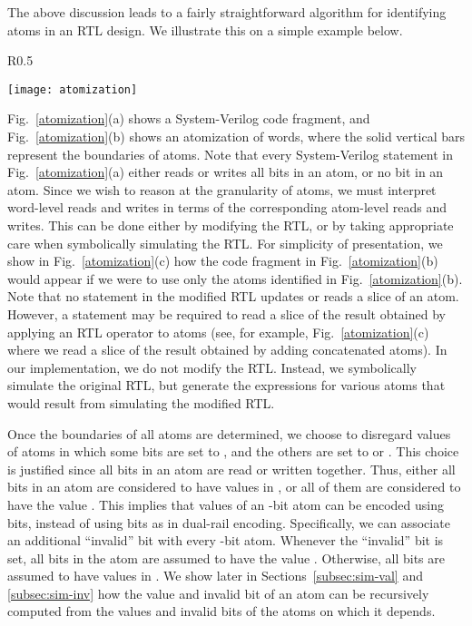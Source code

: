 \documentclass{llncs}
\begin{document}
The above discussion leads to a fairly straightforward algorithm for
identifying atoms in an RTL design.  We illustrate this on a simple example below.
\begin{wrapfigure}[16]{R}{0.5\textwidth}
\vspace*{-0.4in}
\begin{center}
\texttt{[image: atomization]}
\end{center}
\vspace*{-0.2in}
\caption{\label{atomization}Illustrating atomization}
\end{wrapfigure}
Fig.~\ref{atomization}(a) shows a System-Verilog code fragment, and
Fig.~\ref{atomization}(b) shows an atomization of words, where the
solid vertical bars represent the boundaries of atoms.  Note that
every System-Verilog statement in Fig.~\ref{atomization}(a) either
reads or writes all bits in an atom, or no bit in an atom.  Since we
wish to reason at the granularity of atoms, we must interpret
word-level reads and writes in terms of the corresponding atom-level
reads and writes.  This can be done either by modifying the RTL, or by
taking appropriate care when symbolically simulating the RTL.  For
simplicity of presentation, we show in Fig.~\ref{atomization}(c) how
the code fragment in Fig.~\ref{atomization}(b) would appear if we were
to use only the atoms identified in Fig.~\ref{atomization}(b).  Note
that no statement in the modified RTL updates or reads a slice of an
atom.  However, a statement may be required to read a slice of the
result obtained by applying an RTL operator to atoms (see, for example,
Fig.~\ref{atomization}(c) where we read a slice of the result obtained by
adding concatenated atoms). In our implementation, we do not modify the RTL.
Instead, we symbolically simulate the original RTL, but generate the
expressions for various atoms that would result from simulating the
modified RTL.

Once the boundaries of all atoms are determined, we choose to
disregard values of atoms in which some bits are set to , and the
others are set to  or .  This choice is justified since all bits
in an atom are  read or written together.  Thus, either all bits
in an atom are considered to have values in , or all of them
are considered to have the value .  This implies that values of an
-bit atom can be encoded using  bits, instead of using 
bits as in dual-rail encoding.  Specifically, we can associate an
additional ``invalid'' bit with every -bit atom.  Whenever the
``invalid'' bit is set, all bits in the atom are assumed to have the
value .  Otherwise, all bits are assumed to have values in .  We show later in Sections~\ref{subsec:sim-val} and
\ref{subsec:sim-inv} how the value and invalid bit of an atom can be
recursively computed from the values and invalid bits of the atoms on
which it depends.
\end{document}

